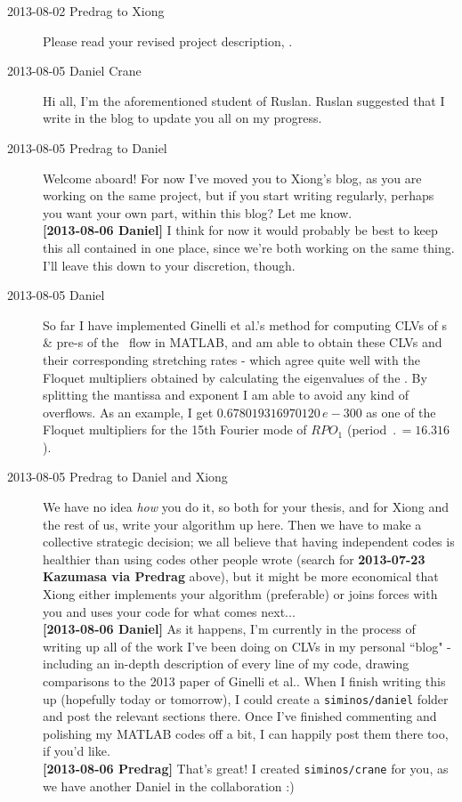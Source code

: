 \begin{description}
\item[2013-08-02 Predrag to Xiong] Please read your revised project
    description, .

\item[2013-08-05 Daniel Crane] Hi all, I'm the aforementioned student of
Ruslan. Ruslan suggested that I write in the blog to update you all on my
progress.

\item[2013-08-05 Predrag to Daniel] Welcome aboard! For now I've moved
you to Xiong's blog, as you are working on the same project, but if you
start writing regularly, perhaps you want your own part, within this
blog? Let me know. \\
{\bf [2013-08-06 Daniel]} I think for now it would probably be best to
keep this all contained in one place, since we're both working on the
same thing. I'll leave this down to your discretion, though.

\item[2013-08-05 Daniel]
So far I have implemented Ginelli et al.'s method for computing CLVs of
\rpo s \& pre-\po s of the \KS\ flow in MATLAB, and am able to obtain these CLVs
and their corresponding stretching rates - which agree quite well with
the Floquet multipliers obtained by calculating the eigenvalues of the
{\stabmat}. By splitting the mantissa and exponent I am able to
avoid any kind of overflows. As an example, I get
$0.678019316970120\,e-300$
as one of the Floquet multipliers for the 15th Fourier mode of $RPO_1$
(period $\period{}=16.316$).

\item[2013-08-05 Predrag to Daniel and Xiong] We have no idea \emph{how}
you do it, so both for your thesis, and for Xiong and the rest of us,
write your algorithm up here. Then we have to make a collective strategic
decision; we all believe that having independent codes is healthier than
using codes other people wrote (search for {\bf 2013-07-23 Kazumasa via
Predrag} above), but it might be more economical that Xiong either
implements your algorithm (preferable) or joins forces with you and uses
your code for what comes next...
\\
{\bf [2013-08-06 Daniel]} As it happens, I'm currently in the process of
writing up all of the work I've been doing on CLVs in my personal ``blog"
- including an in-depth description of every line of my code, drawing
comparisons to the 2013 paper of Ginelli et al..
When I finish writing this up (hopefully today or tomorrow),
I could create a \texttt{siminos/daniel} folder and post the relevant sections there.
Once I've finished commenting and polishing my MATLAB codes off a bit,
I can happily post them there too, if you'd like.
\\
{\bf [2013-08-06 Predrag]} That's great! I created \texttt{siminos/crane} for you,
as we have another Daniel in the collaboration :)


\end{description}
